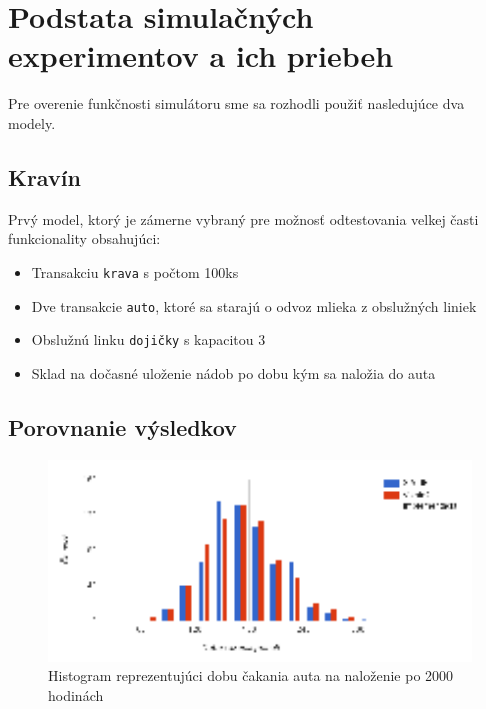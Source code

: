 \documentclass[11pt, a4paper, titlepage]{article}
\begin{document}
\section{Podstata simulačných experimentov a ich priebeh}
Pre overenie funkčnosti simulátoru sme sa rozhodli použiť nasledujúce dva modely.

%
\subsection{Kravín}

Prvý model\cite[slide 22]{demo1}, ktorý je zámerne vybraný pre možnosť odtestovania velkej časti funkcionality obsahujúci:
\begin{itemize}
    \item Transakciu \texttt{krava} s počtom 100ks
    \item Dve transakcie \texttt{auto}, ktoré sa starajú o odvoz mlieka z obslužných liniek
    \item Obslužnú linku \texttt{dojičky} s kapacitou 3
    \item Sklad na dočasné uloženie nádob po dobu kým sa naložia do auta
\end{itemize}

\subsection*{Porovnanie výsledkov}

\begin{figure}[h!]
    \includegraphics[width=12cm]{graf_kravin.eps}
    \centering
    \caption{Histogram reprezentujúci dobu čakania auta na naloženie po 2000 hodinách}
\end{figure}
\end{document}
